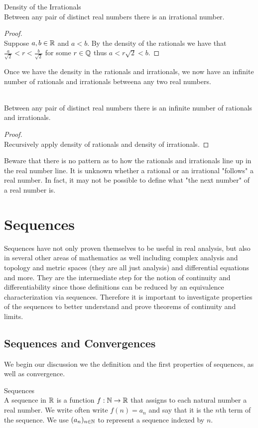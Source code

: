 \documentclass[a4paper]{article}
\begin{document}
\begin{thm}{Density of the Irrationals}{}\\ Between any pair of distinct real numbers there is an irrational number. 
\begin{proof}\\ Suppose $a,b\in\mathbb{R}$ and $a<b$. By the density of the rationals we have that $\frac{a}{\sqrt{2}}<r<\frac{b}{\sqrt{2}}$ for some $r\in\mathbb{Q}$ thus $a<r\sqrt{2}<b$. 
\end{proof}
\end{thm}

Once we have the density in the rationals and irrationals, we now have an infinite number of rationals and irrationals betweena any two real numbers. 

\begin{crl}{}{}\\ Between any pair of distinct real numbers there is an infinite number of rationals and irrationals. 
\begin{proof}\\ Recursively apply density of rationals and density of irrationals. 
\end{proof}
\end{crl}

Beware that there is no pattern as to how the rationals and irrationals line up in the real number line. It is unknown whether a rational or an irrational "follows" a real number. In fact, it may not be possible to define what "the next number" of a real number is. 

\pagebreak
\section{Sequences}
Sequences have not only proven themselves to be useful in real analysis, but also in several other areas of mathematics as well including complex analysis and topology and metric spaces (they are all just analysis) and differential equations and more. They are the intermediate step for the notion of continuity and differentiability since those definitions can be reduced by an equivalence characterization via sequences. Therefore it is important to investigate properties of the sequences to better understand and prove theorems of continuity and limits. 

\subsection{Sequences and Convergences}
We begin our discussion we the definition and the first properties of sequences, as well as convergence. 
\begin{defn}{Sequences}{}\\
A sequence in $\mathbb{R}$ is a function $f:\mathbb{N}\to\mathbb{R}$ that assigns to each natural number a real number. We write often write $f(n)=a_n$ and say that it is the $n$th term of the sequence. We use $(a_n)_{n\in\mathbb{N}}$ to represent a sequence indexed by $n$. 
\end{defn}
\end{document}
